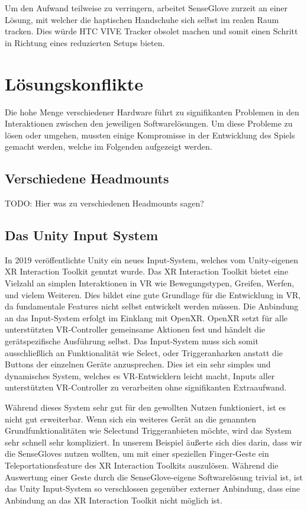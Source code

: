 Um den Aufwand teilweise zu verringern, arbeitet SenseGlove zurzeit an einer Lösung, mit welcher die haptischen Handschuhe sich selbst im realen Raum tracken. Dies würde HTC VIVE Tracker obsolet machen und somit einen Schritt in Richtung eines reduzierten Setups bieten.


\section{Lösungskonflikte}
Die hohe Menge verschiedener Hardware führt zu signifikanten Problemen in den Interaktionen zwischen den jeweiligen Softwarelösungen. Um diese Probleme zu lösen oder umgehen, mussten einige Kompromisse in der Entwicklung des Spiels gemacht werden, welche im Folgenden aufgezeigt werden.

\subsection{Verschiedene Headmounts}
TODO: Hier was zu verschiedenen Headmounts sagen? 

\subsection{Das Unity Input System}
In 2019 veröffentlichte Unity ein neues Input-System, welches vom Unity-eigenen XR Interaction Toolkit genutzt wurde. Das XR Interaction Toolkit bietet eine Vielzahl an simplen Interaktionen in VR wie Bewegungstypen, Greifen, Werfen, und vielem Weiteren. Dies bildet eine gute Grundlage für die Entwicklung in VR, da fundamentale Features nicht selbst entwickelt werden müssen. Die Anbindung an das Input-System erfolgt im Einklang mit OpenXR. OpenXR setzt für alle unterstützten VR-Controller gemeinsame Aktionen fest und händelt die gerätspezifische Ausführung selbst. Das Input-System muss sich somit ausschließlich an Funktionalität wie \dq Select\dq, oder \dq Trigger\dq anharken anstatt die Buttons der einzelnen Geräte anzusprechen. Dies ist ein sehr simples und dynamisches System, welches es VR-Entwicklern leicht macht, Inputs aller unterstützten VR-Controller zu verarbeiten ohne signifikanten Extraaufwand. 

Während dieses System sehr gut für den gewollten Nutzen funktioniert, ist es nicht gut erweiterbar. Wenn sich ein weiteres Gerät an die genannten Grundfunktionalitäten wie \dq Select\dq und \dq Trigger\dq anbieten möchte, wird das System sehr schnell sehr kompliziert. In unserem Beispiel äußerte sich dies darin, dass wir die SenseGloves nutzen wollten, um mit einer speziellen Finger-Geste ein Teleportationsfeature des XR Interaction Toolkits auszulösen. Während die Auswertung einer Geste durch die SenseGlove-eigene Softwarelösung trivial ist, ist das Unity Input-System so verschlossen gegenüber externer Anbindung, dass eine Anbindung an das XR Interaction Toolkit nicht möglich ist.

